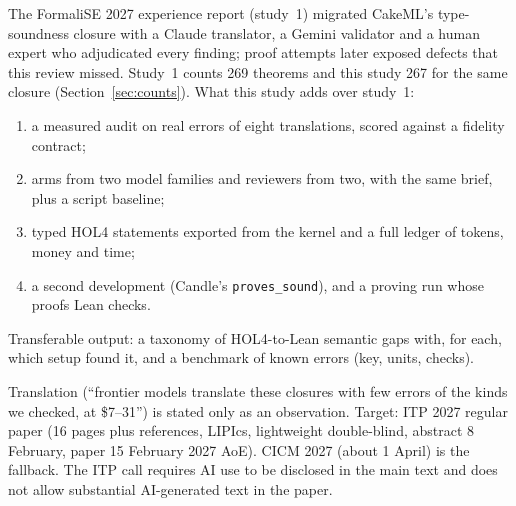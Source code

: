 \documentclass[11pt,a4paper]{article}
\newcommand{\code}[1]{\texttt{#1}}
\begin{document}
The FormaliSE 2027 experience report (study~1) migrated CakeML's type-soundness closure with a Claude translator, a Gemini validator and a human expert who adjudicated every finding; proof attempts later exposed defects that this review missed. Study~1 counts 269 theorems and this study 267 for the same closure (Section~\ref{sec:counts}). What this study adds over study~1:
\begin{enumerate}
\item a measured audit on real errors of eight translations, scored against a fidelity contract;
\item arms from two model families and reviewers from two, with the same brief, plus a script baseline;
\item typed HOL4 statements exported from the kernel and a full ledger of tokens, money and time;
\item a second development (Candle's \code{proves\_sound}), and a proving run whose proofs Lean checks.
\end{enumerate}
Transferable output: a taxonomy of HOL4-to-Lean semantic gaps with, for each, which setup found it, and a benchmark of known errors (key, units, checks).

Translation (``frontier models translate these closures with few errors of the kinds we checked, at \$7--31'') is stated only as an observation. Target: ITP 2027 regular paper (16 pages plus references, LIPIcs, lightweight double-blind, abstract 8 February, paper 15 February 2027 AoE). CICM 2027 (about 1 April) is the fallback. The ITP call requires AI use to be disclosed in the main text and does not allow substantial AI-generated text in the paper.
\end{document}
